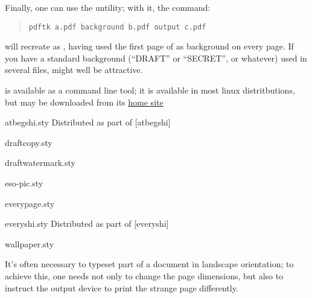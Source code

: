 Finally, one can use the  untility; with it, the
command:
\begin{quote}
\begin{verbatim}
pdftk a.pdf background b.pdf output c.pdf
\end{verbatim}
\end{quote}
will recreate  as , having used the first page
of  as background on every page.  If you have a standard
background (``DRAFT'' or ``SECRET'', or whatever) used in several
files,  might well be attractive.

 is available as a command line tool; it is available
in most linux distritbutions, but may be downloaded from its
\href{http://www.pdflabs.com/tools/pdftk-the-pdf-toolkit/}{home site}
\begin{ctanrefs}
\item[atbegshi.sty]Distributed as part of [atbegshi]
\item[draftcopy.sty]
\item[draftwatermark.sty]
\item[eso-pic.sty]
\item[everypage.sty]
\item[everyshi.sty]Distributed as part of [everyshi]
\item[wallpaper.sty]
\end{ctanrefs}


It's often necessary to typeset part of a document in landscape
orientation; to achieve this, one needs not only to change the page
dimensions, but also to instruct the output device to print the
strange page differently.

